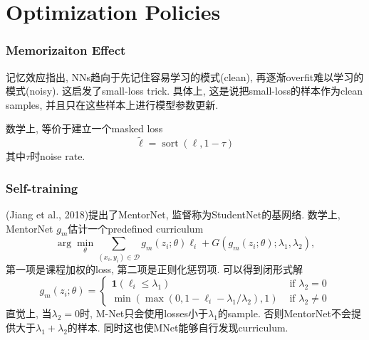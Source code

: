 \documentclass{beamer}
\begin{document}
\section{Optimization Policies}

\begin{frame}
    \frametitle{Memorizaiton Effect}

    记忆效应指出, NNs趋向于先记住容易学习的模式(clean), 再逐渐overfit难以学习的模式(noisy). 这启发了small-loss trick. 具体上, 这是说把small-loss的样本作为clean samples, 并且只在这些样本上进行模型参数更新. 

    数学上, 等价于建立一个masked loss
    \begin{equation}
        \tilde{\ell}=\operatorname{sort}(\ell, 1-\tau)
    \end{equation}
    其中$\tau$时noise rate.

\end{frame}

\begin{frame}
    \frametitle{Self-training}

    (Jiang et al., 2018)提出了MentorNet, 监督称为StudentNet的基网络. 数学上, MentorNet $g_m$估计一个predefined curriculum
    \begin{equation}
        \arg \min _{\theta} \sum_{\left(x_{i}, y_{i}\right) \in \mathcal{D}} g_{m}\left(z_{i} ; \theta\right) \ell_{i}+G\left(g_{m}\left(z_{i} ; \theta\right) ; \lambda_{1}, \lambda_{2}\right),
    \end{equation}
    第一项是课程加权的loss, 第二项是正则化惩罚项. 可以得到闭形式解
    \begin{equation}
        g_{m}\left(z_{i} ; \theta\right)=\left\{\begin{array}{ll}
        \mathbf{1}\left(\ell_{i} \leq \lambda_{1}\right) & \text { if } \lambda_{2}=0 \\
        \min \left(\max \left(0,1-\ell_{i}-\lambda_{1} / \lambda_{2}\right), 1\right) & \text { if } \lambda_{2} \neq 0
        \end{array}\right.
    \end{equation}
    直觉上, 当$\lambda_2 = 0$时, M-Net只会使用losses小于$\lambda_1$的sample. 否则MentorNet不会提供大于$\lambda_1 + \lambda_2$的样本. 同时这也使MNet能够自行发现curriculum.

\end{frame}
\end{document}
